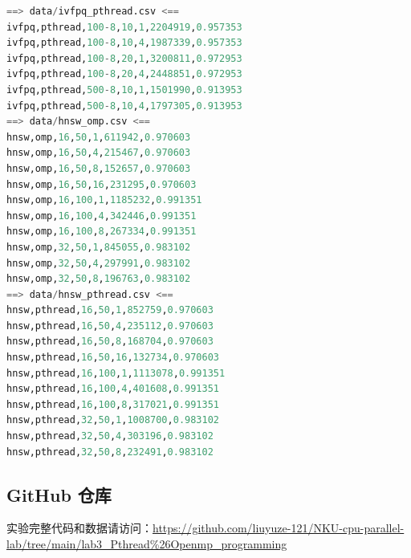 \documentclass[a4paper]{article}
\begin{document}
\begin{lstlisting}[language=Python,frame=single,numbers=none]
==> data/ivfpq_pthread.csv <==
ivfpq,pthread,100-8,10,1,2204919,0.957353
ivfpq,pthread,100-8,10,4,1987339,0.957353
ivfpq,pthread,100-8,20,1,3200811,0.972953
ivfpq,pthread,100-8,20,4,2448851,0.972953
ivfpq,pthread,500-8,10,1,1501990,0.913953
ivfpq,pthread,500-8,10,4,1797305,0.913953
==> data/hnsw_omp.csv <==
hnsw,omp,16,50,1,611942,0.970603
hnsw,omp,16,50,4,215467,0.970603
hnsw,omp,16,50,8,152657,0.970603
hnsw,omp,16,50,16,231295,0.970603
hnsw,omp,16,100,1,1185232,0.991351
hnsw,omp,16,100,4,342446,0.991351
hnsw,omp,16,100,8,267334,0.991351
hnsw,omp,32,50,1,845055,0.983102
hnsw,omp,32,50,4,297991,0.983102
hnsw,omp,32,50,8,196763,0.983102
==> data/hnsw_pthread.csv <==
hnsw,pthread,16,50,1,852759,0.970603
hnsw,pthread,16,50,4,235112,0.970603
hnsw,pthread,16,50,8,168704,0.970603
hnsw,pthread,16,50,16,132734,0.970603
hnsw,pthread,16,100,1,1113078,0.991351
hnsw,pthread,16,100,4,401608,0.991351
hnsw,pthread,16,100,8,317021,0.991351
hnsw,pthread,32,50,1,1008700,0.983102
hnsw,pthread,32,50,4,303196,0.983102
hnsw,pthread,32,50,8,232491,0.983102
\end{lstlisting}

\subsection{GitHub 仓库}

实验完整代码和数据请访问：\url{https://github.com/liuyuze-121/NKU-cpu-parallel-lab/tree/main/lab3_Pthread%26Openmp_programming}
\end{document}
